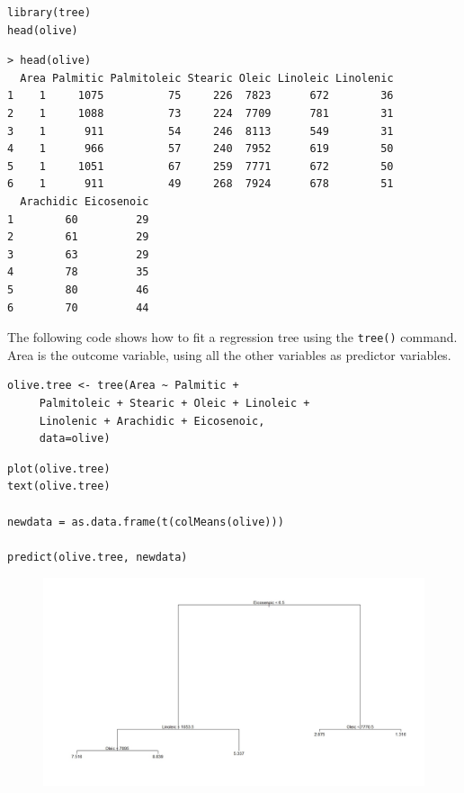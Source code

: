 \documentclass[caret-main.tex]{subfiles}
\begin{document}
\newpage
\begin{framed}
\begin{verbatim}
library(tree)
head(olive)
\end{verbatim}
\end{framed}
\begin{verbatim}
> head(olive)
  Area Palmitic Palmitoleic Stearic Oleic Linoleic Linolenic
1    1     1075          75     226  7823      672        36
2    1     1088          73     224  7709      781        31
3    1      911          54     246  8113      549        31
4    1      966          57     240  7952      619        50
5    1     1051          67     259  7771      672        50
6    1      911          49     268  7924      678        51
  Arachidic Eicosenoic
1        60         29
2        61         29
3        63         29
4        78         35
5        80         46
6        70         44
\end{verbatim}
The following code shows how to fit a regression tree using the \texttt{tree()} command. Area is the outcome variable, using all the other variables as predictor variables.
\begin{framed}
\begin{verbatim}
olive.tree <- tree(Area ~ Palmitic + 
     Palmitoleic + Stearic + Oleic + Linoleic + 
     Linolenic + Arachidic + Eicosenoic, 
     data=olive)
\end{verbatim}
\end{framed}

\newpage
\begin{framed}
\begin{verbatim}
plot(olive.tree)
text(olive.tree)

newdata = as.data.frame(t(colMeans(olive)))

predict(olive.tree, newdata)

\end{verbatim}
\end{framed}
\begin{figure}
\centering
\includegraphics[width=0.70\linewidth]{./DAquiz6q4a}
\caption{}
\label{fig:DAquiz6q4a}
\end{figure}
\end{document}
